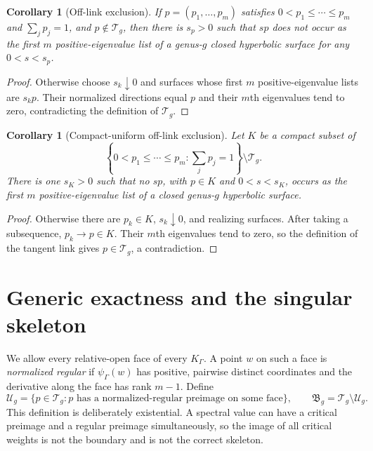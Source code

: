 \documentclass[11pt,reqno]{amsart}
\newtheorem{corollary}[theorem]{Corollary}
\theoremstyle{definition}
\theoremstyle{remark}
\begin{document}
\begin{corollary}[Off-link exclusion]\label{cor:off-link}
If $p=(p_1,\ldots,p_m)$ satisfies
$0<p_1\le\cdots\le p_m$ and $\sum_jp_j=1$, and
$p\notin\mathcal T_g$, then there is
$s_p>0$ such that $sp$ does not occur as the first $m$ positive-eigenvalue
list of a genus-$g$ closed hyperbolic surface for any $0<s<s_p$.
\end{corollary}

\begin{proof}
Otherwise choose $s_k\downarrow0$ and surfaces whose first $m$
positive-eigenvalue lists are $s_kp$.
Their normalized directions equal $p$ and their $m$th eigenvalues tend to
zero, contradicting the definition of $\mathcal T_g$.
\end{proof}

\begin{corollary}[Compact-uniform off-link exclusion]
\label{cor:off-link-compact}
Let $K$ be a compact subset of
\[
 \left\{0<p_1\le\cdots\le p_m:\sum_jp_j=1\right\}
 \setminus\mathcal T_g.
\]
There is one $s_K>0$ such that no $sp$, with $p\in K$ and
$0<s<s_K$, occurs as the first $m$ positive-eigenvalue list of a closed
genus-$g$ hyperbolic surface.
\end{corollary}

\begin{proof}
Otherwise there are $p_k\in K$, $s_k\downarrow0$, and realizing surfaces.
After taking a subsequence, $p_k\to p\in K$.  Their $m$th eigenvalues tend
to zero, so the definition of the tangent link gives $p\in\mathcal T_g$, a
contradiction.
\end{proof}

\section{Generic exactness and the singular skeleton}
\label{sec:generic}

We allow every relative-open face of every $K_\Gamma$.  A point $w$ on such
a face is \emph{normalized regular} if $\psi_\Gamma(w)$ has positive,
pairwise distinct coordinates and the derivative along the face has rank
$m-1$.  Define
\begin{equation}\label{eq:U-B-def}
 \mathcal U_g=\{p\in\mathcal T_g:p\text{ has a normalized-regular
 preimage on some face}\},\qquad
 \mathfrak B_g=\mathcal T_g\setminus\mathcal U_g.
\end{equation}
This definition is deliberately existential.  A spectral value can have a
critical preimage and a regular preimage simultaneously, so the image of all
critical weights is not the boundary and is not the correct skeleton.
\end{document}
